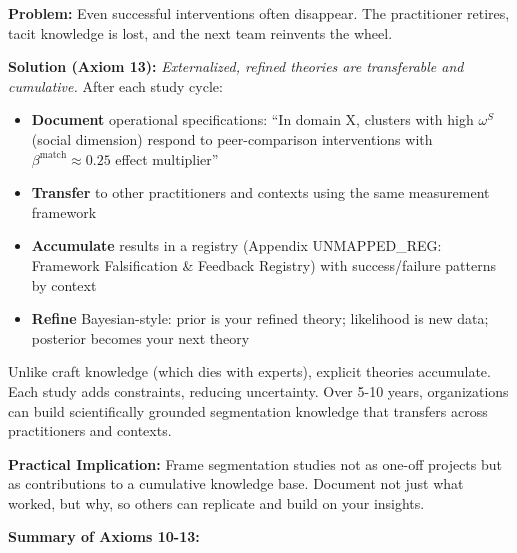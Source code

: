 \textbf{Problem:} Even successful interventions often disappear. The practitioner retires, tacit knowledge is lost, and the next team reinvents the wheel.

\textbf{Solution (Axiom 13):} \emph{Externalized, refined theories are transferable and cumulative.} After each study cycle:

\begin{itemize}[nosep]
\item \textbf{Document} operational specifications: ``In domain X, clusters with high $\omega^S$ (social dimension) respond to peer-comparison interventions with $\beta^{\text{match}} \approx 0.25$ effect multiplier''
\item \textbf{Transfer} to other practitioners and contexts using the same measurement framework
\item \textbf{Accumulate} results in a registry (Appendix UNMAPPED_REG: Framework Falsification \& Feedback Registry) with success/failure patterns by context
\item \textbf{Refine} Bayesian-style: prior is your refined theory; likelihood is new data; posterior becomes your next theory
\end{itemize}

Unlike craft knowledge (which dies with experts), explicit theories accumulate. Each study adds constraints, reducing uncertainty. Over 5-10 years, organizations can build scientifically grounded segmentation knowledge that transfers across practitioners and contexts. \cite{camerer2018evaluatingevaluating, collaboration2015estimating, nosek2015promoting}

\textbf{Practical Implication:} Frame segmentation studies not as one-off projects but as contributions to a cumulative knowledge base. Document not just what worked, but why, so others can replicate and build on your insights.

\vspace{1em}

\textbf{Summary of Axioms 10-13:}

